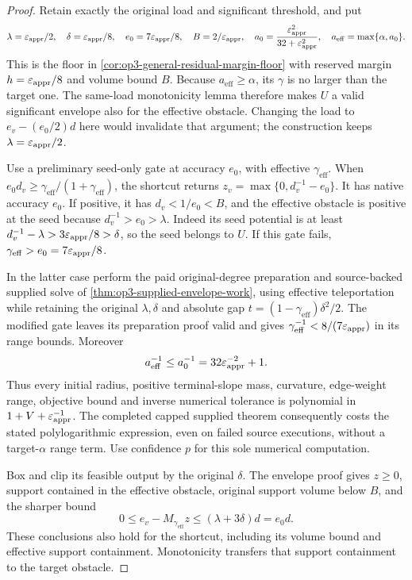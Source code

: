\begin{proof}
Retain exactly the original load and significant threshold, and put
\[
 \lambda=\varepsilon_{\mathrm{appr}}/2,\quad\delta=\varepsilon_{\mathrm{appr}}/8,\quad
 e_0=7\varepsilon_{\mathrm{appr}}/8,\quad B=2/\varepsilon_{\mathrm{appr}},\quad
 a_0=\frac{\varepsilon_{\mathrm{appr}}^2}{32+\varepsilon_{\mathrm{appr}}^2},\quad
 a_{\mathrm{eff}}=\max\{\alpha,a_0\}.
\]
This is the floor in \cref{cor:op3-general-residual-margin-floor}
with reserved margin $h=\varepsilon_{\mathrm{appr}}/8$ and volume bound $B$.
Because $a_{\mathrm{eff}}\geq\alpha$, its $\gamma$ is no larger
than the target one. The same-load monotonicity lemma therefore makes
$U$ a valid significant envelope also for the effective obstacle.
Changing the load to $e_v-(e_0/2)d$ here would invalidate that argument;
the construction keeps $\lambda=\varepsilon_{\mathrm{appr}}/2$.

Use a preliminary seed-only gate at accuracy $e_0$, with effective
$\gamma_{\mathrm{eff}}$. When
$e_0d_v\geq\gamma_{\mathrm{eff}}/(1+\gamma_{\mathrm{eff}})$,
the shortcut returns $z_v=\max\{0,d_v^{-1}-e_0\}$.
It has native accuracy $e_0$. If positive, it has
$d_v<1/e_0<B$, and the effective obstacle is positive at the seed
because $d_v^{-1}>e_0>\lambda$. Indeed its seed potential is at least
$d_v^{-1}-\lambda>3\varepsilon_{\mathrm{appr}}/8>\delta$, so the seed belongs to $U$.
If this gate fails, $\gamma_{\mathrm{eff}}>e_0=7\varepsilon_{\mathrm{appr}}/8$.

In the latter case perform the paid original-degree preparation and
source-backed supplied solve of
\cref{thm:op3-supplied-envelope-work}, using effective teleportation
while retaining the original $\lambda,\delta$ and absolute gap
$t=(1-\gamma_{\mathrm{eff}})\delta^2/2$.
The modified gate leaves its preparation proof valid and gives
$\gamma_{\mathrm{eff}}^{-1}<8/(7\varepsilon_{\mathrm{appr}})$ in its range bounds.
Moreover
\[
 a_{\mathrm{eff}}^{-1}\leq a_0^{-1}
 =32\varepsilon_{\mathrm{appr}}^{-2}+1.
\]
Thus every initial radius, positive terminal-slope mass, curvature,
edge-weight range, objective bound and inverse numerical tolerance is
polynomial in $1+V+\varepsilon_{\mathrm{appr}}^{-1}$. The completed capped supplied
theorem consequently costs the stated polylogarithmic expression, even
on failed source executions, without a target-$\alpha$ range term.
Use confidence $p$ for this sole numerical computation.

Box and clip its feasible output by the original $\delta$. The envelope
proof gives $z\geq0$, support contained in the effective obstacle,
original support volume below $B$, and the sharper bound
\[
 0\leq e_v-M_{\gamma_{\mathrm{eff}}}z
 \leq(\lambda+3\delta)d=e_0d.
\]
These conclusions also hold for the shortcut, including its volume
bound and effective support containment. Monotonicity transfers that
support containment to the target obstacle.


\end{proof}
